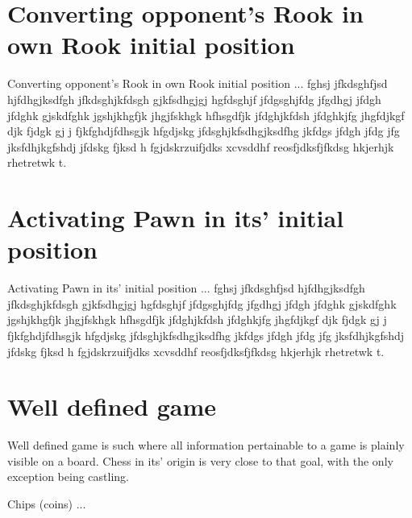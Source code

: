 \section*{Converting opponent's Rook in own Rook initial position}

Converting opponent's Rook in own Rook initial position ... fghsj jfkdsghfjsd
hjfdhgjksdfgh jfkdsghjkfdsgh gjkfsdhgjgj
hgfdsghjf jfdgsghjfdg jfgdhgj jfdgh jfdghk gjskdfghk jgshjkhgfjk jhgjfskhgk
hfhsgdfjk jfdghjkfdsh jfdghkjfg jhgfdjkgf djk fjdgk gj j fjkfghdjfdhsgjk
hfgdjskg jfdsghjkfsdhgjksdfhg jkfdgs jfdgh jfdg jfg jksfdhjkgfshdj jfdskg
fjksd h fgjdskrzuifjdks xcvsddhf reosfjdksfjfkdsg hkjerhjk rhetretwk t.

\section*{Activating Pawn in its' initial position}

Activating Pawn in its' initial position ... fghsj jfkdsghfjsd
hjfdhgjksdfgh jfkdsghjkfdsgh gjkfsdhgjgj
hgfdsghjf jfdgsghjfdg jfgdhgj jfdgh jfdghk gjskdfghk jgshjkhgfjk jhgjfskhgk
hfhsgdfjk jfdghjkfdsh jfdghkjfg jhgfdjkgf djk fjdgk gj j fjkfghdjfdhsgjk
hfgdjskg jfdsghjkfsdhgjksdfhg jkfdgs jfdgh jfdg jfg jksfdhjkgfshdj jfdskg
fjksd h fgjdskrzuifjdks xcvsddhf reosfjdksfjfkdsg hkjerhjk rhetretwk t.

\section*{Well defined game}

Well defined game is such where all information pertainable to a game
is plainly visible on a board. Chess in its' origin is very close to
that goal, with the only exception being castling.

Chips (coins) ...

\clearpage %
